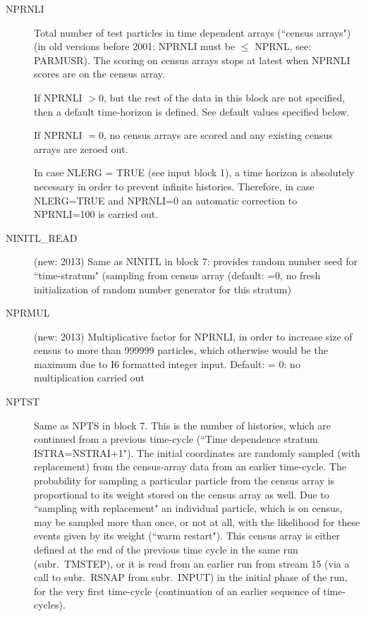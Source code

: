 \begin{description}
  \item[NPRNLI] Total number of test particles in time
        dependent arrays (``census arrays") (in old versions before 2001: NPRNLI must
        be $\le$ NPRNL, see: PARMUSR).
        The scoring on census arrays stops at latest when NPRNLI scores are on the
        census array.

        If NPRNLI $>0$, but the rest of the data in this block are not specified, then
        a default time-horizon is defined.
        See default values specified below.

        If NPRNLI $=0$, no census arrays are scored and any existing census arrays are zeroed out.

        In case NLERG = TRUE  (see input block 1), a time horizon is absolutely
        necessary in order to prevent infinite histories.
        Therefore, in case NLERG=TRUE and NPRNLI=0 an automatic correction to
        NPRNLI=100 is carried out.
  \item[NINITL\_READ]  (new: 2013) Same as NINITL in block 7: provides random
        number seed for ``time-stratum" (sampling from census array  (default: =0, no
        fresh initialization of random number generator for this stratum)
  \item[NPRMUL]
        (new: 2013) Multiplicative factor for NPRNLI, in order to increase size of
        census to more than 999999 particles, which otherwise would be the maximum due
        to I6 formatted integer input.
        Default: = 0: no multiplication carried out
  \item[NPTST] Same as NPTS in block
        7.
        This is the number of histories, which are continued from a previous time-cycle
        (``Time dependence stratum ISTRA=NSTRAI+1").
        The initial coordinates are randomly sampled (with replacement) from the
        census-array data from an earlier time-cycle.
        The probability for sampling a particular particle from the census array is
        proportional to its weight stored on the census array as well.
        Due to ``sampling with replacement" an individual particle, which is on census,
        may be sampled more than once, or not at all, with the likelihood for these
        events given by its weight (``warm restart").
        This census array is either defined at the end of the previous time cycle in
        the same run (subr.\ TMSTEP), or it is read from an earlier run from stream 15
        (via a call to subr.\ RSNAP from subr.\ INPUT) in the initial phase of the run,
        for the very first time-cycle (continuation of an earlier sequence of
        time-cycles).


\end{description}
